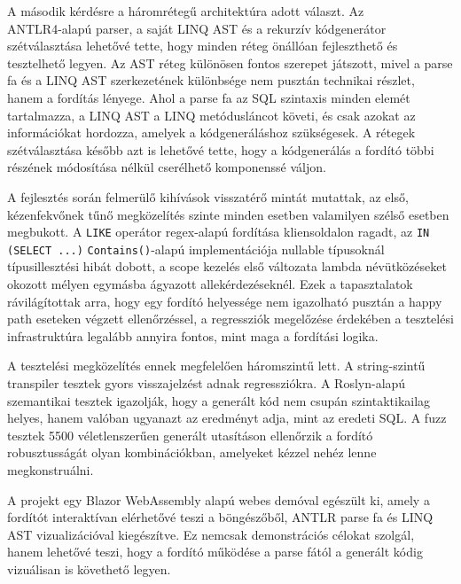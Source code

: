 \documentclass[a4paper,12pt]{article}
\begin{document}
A második kérdésre a háromrétegű architektúra adott választ. Az \\ANTLR4-alapú parser, a saját LINQ AST és a rekurzív kódgenerátor szétválasztása lehetővé tette, hogy minden réteg önállóan fejleszthető és tesztelhető legyen. Az AST réteg különösen fontos szerepet játszott, mivel a parse fa és a LINQ AST szerkezetének különbsége nem pusztán technikai részlet, hanem a fordítás lényege. Ahol a parse fa az SQL szintaxis minden elemét tartalmazza, a LINQ AST a LINQ metódusláncot követi, és csak azokat az információkat hordozza, amelyek a kódgeneráláshoz szükségesek. A rétegek szétválasztása később azt is lehetővé tette, hogy a kódgenerálás a fordító többi részének módosítása nélkül cserélhető komponenssé váljon.

A fejlesztés során felmerülő kihívások visszatérő mintát mutattak, az első, kézenfekvőnek tűnő megközelítés szinte minden esetben valamilyen szélső esetben megbukott. A \texttt{LIKE} operátor regex-alapú fordítása kliensoldalon ragadt, az \texttt{IN (SELECT ...)} \texttt{Contains()}-alapú implementációja nullable típusoknál típusillesztési hibát dobott, a scope kezelés első változata lambda névütközéseket okozott mélyen egymásba ágyazott allekérdezéseknél. Ezek a tapasztalatok rávilágítottak arra, hogy egy fordító helyessége nem igazolható pusztán a happy path eseteken végzett ellenőrzéssel, a regressziók megelőzése érdekében a tesztelési infrastruktúra legalább annyira fontos, mint maga a fordítási logika.

A tesztelési megközelítés ennek megfelelően háromszintű lett. A string-szintű transpiler tesztek gyors visszajelzést adnak regressziókra. A Roslyn-alapú szemantikai tesztek igazolják, hogy a generált kód nem csupán szintaktikailag helyes, hanem valóban ugyanazt az eredményt adja, mint az eredeti SQL. A fuzz tesztek 5500 véletlenszerűen generált utasításon ellenőrzik a fordító robusztusságát olyan kombinációkban, amelyeket kézzel nehéz lenne megkonstruálni.

A projekt egy Blazor WebAssembly alapú webes demóval egészült ki, amely a fordítót interaktívan elérhetővé teszi a böngészőből, ANTLR parse fa és LINQ AST vizualizációval kiegészítve. Ez nemcsak demonstrációs célokat szolgál, hanem lehetővé teszi, hogy a fordító működése a parse fától a generált kódig vizuálisan is követhető legyen.
\end{document}
